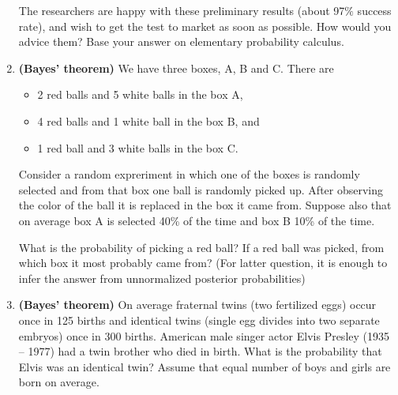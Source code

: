 \documentclass[11pt,a4paper,english]{article}
\begin{document}
\begin{enumerate}
  The researchers are happy with these preliminary results (about 97$\%$
  success rate), and wish to get the test to market as soon as
  possible. How would you advice them? Base your answer on elementary
  probability calculus.


\item {\bf (Bayes' theorem)} We have three boxes, A, B and C. There are
  \begin{itemize}
    \item 2 red balls and 5 white balls in the box A,
    \item 4 red balls and 1 white ball in the box B, and
    \item 1 red ball and 3 white balls in the box C.
  \end{itemize}
Consider a random expreriment in which one of the boxes is randomly
selected and from that box one ball is randomly picked up. After
observing the color of the ball it is replaced in the box it came
from. Suppose also that on average box A is selected 40\% of the time
and box B 10\% of the time.

What is the probability of picking a red ball? If a red ball was
picked, from which box it most probably came from? (For latter question, it is enough to infer the answer from unnormalized posterior probabilities)



\item {\bf (Bayes' theorem)} On average fraternal twins (two fertilized eggs) occur once in 125
births and identical twins (single egg divides into two separate
embryos) once in 300 births.
American male singer actor Elvis Presley (1935 -- 1977) had a twin brother who died in birth.
What is the probability that Elvis was an identical twin?
Assume that equal number of boys and girls are born on average.






\end{enumerate}
\end{document}

